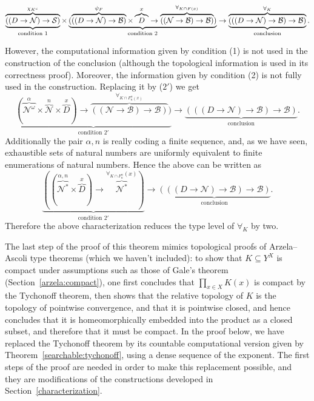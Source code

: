 \documentclass{LMCS}
\newcommand{\myomega}{\omega}
\newcommand{\pN}{\mathcal{N}}
\newcommand{\pBool}{\mathcal{B}}
\begin{document}
{\footnotesize
\[
\underbrace{\overbrace{((D \to \pN) \to \Sierp)}^{\chi_{K^c}}}_{\text{condition 1}} 
\times \underbrace{(\overbrace{((D \to \pN) \to \pBool)}^{\psi_F} \times \overbrace{D}^{x} \to  \overbrace{((\pN \to \pBool) \to \pBool)}^{\forall_{K \cap F(x)}})}_{\text{condition 2}}
\to \underbrace{\overbrace{(((D \to \pN) \to \pBool) \to \pBool)}^{\forall_K}}_{\text{conclusion}}.
\]}

However, the computational information given by condition (1) is not
used in the construction of the conclusion (although the topological
information is used in its correctness proof). Moreover, the
information given by condition (2) is not fully used in the
construction. Replacing it by ($2'$) we get
\[
\underbrace{(\overbrace{\pN^\myomega}^{\alpha} \times \overbrace{\pN}^{n} \times \overbrace{D}^{x}) \to \overbrace{((\pN \to \pBool) \to \pBool)}^{\forall_{K\cap F_n^\alpha(x)}})}_{\text{condition $2'$}}
\to \underbrace{(((D \to \pN) \to \pBool) \to \pBool)}_{\text{conclusion}}.
\]
Additionally the pair $\alpha,n$ is really coding a finite sequence,
and, as we have seen, exhaustible sets of natural numbers are uniformly
equivalent to finite enumerations of natural numbers. Hence the
above can be written as
\[
\underbrace{((\overbrace{\pN^*}^{\alpha,n} \times \overbrace{D}^{x}) \to \overbrace{\pN^*}^{\forall_{K\cap F_n^\alpha}(x)})}_{\text{condition $2'$}}
\to \underbrace{(((D \to \pN) \to \pBool) \to \pBool)}_{\text{conclusion}}.
\]
Therefore the above characterization reduces the type level of
$\forall_K$ by two.

\medskip

The last step of the proof of this theorem mimics topological proofs
of Arzela--Ascoli type theorems (which we haven't included): to show
that $K \subseteq Y^X$ is compact under assumptions such as those of
Gale's theorem (Section~\ref{arzela:compact}), one first concludes
that $\prod_{x \in X} K(x)$ is compact by the Tychonoff theorem, then
shows that the relative topology of $K$ is the topology of pointwise
convergence, and that it is pointwise closed, and hence concludes that
it is homeomorphically embedded into the product as a closed subset,
and therefore that it must be compact. In the proof below, we have
replaced the Tychonoff theorem by its countable computational version
given by Theorem~\ref{searchable:tychonoff}, using a dense sequence of
the exponent. The first steps of the proof are needed in order to
make this replacement possible, and they are modifications of the
constructions developed in Section~\ref{characterization}.
\end{document}
